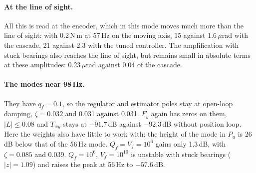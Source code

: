 \documentclass[10pt,a4paper]{article}
\numberwithin{equation}{section}
\begin{document}
\begin{table}[H]\centering\footnotesize\setlength{\tabcolsep}{3pt}
\caption{Elevation on the Dahl plant, $Q_f=10^4$. Sines: encoder over torque [dB rad/(N\,m)], moving on the circle or at rest. Line of sight [$\mu$rad] at rest, 0.002\,N\,m, 57.8\,Hz. Doublets: rms error [mdeg], largest current [A], median settling [s]. Full orbit: error of the line of sight, rms [mdeg], and effect of noise of 1 and 10\,$\mu$rad on it, rms [$\mu$rad].}\label{tab:twydahl}
\end{table}

\paragraph{At the line of sight.} All this is read at the encoder, which in this mode moves much more than the line of sight: with 0.2\,N\,m at 57\,Hz on the moving axis, 15 against 1.6\,$\mu$rad with the cascade, 21 against 2.3 with the tuned controller. The amplification with stuck bearings also reaches the line of sight, but remains small in absolute terms at these amplitudes: 0.23\,$\mu$rad against 0.04 of the cascade.

\paragraph{The modes near 98\,Hz.} They have $q_f=0.1$, so the regulator and estimator poles stay at open-loop damping, $\zeta=0.032$ and 0.031 against 0.031. $F_y$ again has zeros on them, $|L|\le0.08$ and $T_{wy}$ stays at $-91.7$\,dB against $-92.3$\,dB without position loop. Here the weights also have little to work with: the height of the mode in $P_u$ is 26\,dB below that of the 56\,Hz mode. $Q_f=V_f=10^6$ gains only 1.3\,dB, with $\zeta=0.085$ and 0.039. $Q_f=10^6$, $V_f=10^{10}$ is unstable with stuck bearings ($|z|=1.09$) and raises the peak at 56\,Hz to $-57.6$\,dB.
\end{document}
